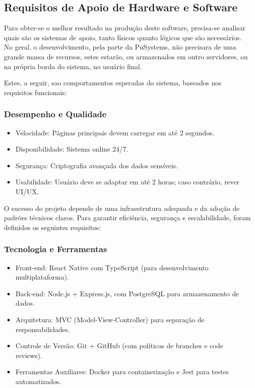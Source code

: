 \documentclass[a4paper, 12pt]{article}
\begin{document}
\subsection{Requisitos de Apoio de Hardware e Software}

Para obter-se o melhor resultado na produção deste software, precisa-se analisar quais são os sistemas de apoio, tanto físicos quanto lógicos que são necessários. No geral, o desenvolvimento, pela parte da PuSystems, não precisara de uma grande massa de recursos, estes estarão, ou armazenados em outro servidores, ou na própria borda do sistema, no usuário final. 

Estes, a seguir, sao comportamentos esperadas do sistema, baseados nos requisitos funcionais: 

\subsubsection{Desempenho e Qualidade}
\begin{itemize}[label=--]
  \item Velocidade: Páginas principais devem carregar em até 2 segundos.
  \item Disponibilidade: Sistema online 24/7.
  \item Segurança: Criptografia avançada dos dados sensíveis.
  \item Usabilidade: Usuário deve se adaptar em até 2 horas; caso contrário, rever UI/UX.
\end{itemize}

O sucesso do projeto depende de uma infraestrutura adequada e da adoção de padrões técnicos claros. Para garantir eficiência, segurança e escalabilidade, foram definidos os seguintes requisitos:

\subsubsection{Tecnologia e Ferramentas}
\begin{itemize}[]
\item Front-end: React Native com TypeScript (para desenvolvimento multiplataforma).
\item Back-end: Node.js + Express.js, com PostgreSQL para armazenamento de dados.
\item Arquitetura: MVC (Model-View-Controller) para separação de responsabilidades.
\item Controle de Versão: Git + GitHub (com políticas de branches e code reviews).
\item Ferramentas Auxiliares: Docker para containerização e Jest para testes automatizados.
\end{itemize}
\end{document}
